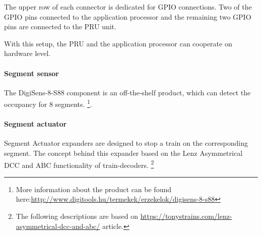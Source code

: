
The upper row of each connector is dedicated for GPIO connections. Two of the GPIO pins connected to the application processor and the remaining two GPIO pins are connected to the PRU unit.

With this setup, the PRU and the application processor can cooperate on hardware level.

\paragraph{Segment sensor}\label{par:SegmentSensor}
The DigiSens-8-S88 component is an off-the-shelf product, which can detect the occupancy for 8 segments. \footnote{More information about the product can be found here:\url{http://www.digitools.hu/termekek/erzekelok/digisens-8-s88}}.

\paragraph{Segment actuator}
Segment Actuator expanders are designed to stop a train on the corresponding segment. The concept behind this expander based on the Lenz Asymmetrical DCC and ABC functionality of train-decoders. \footnote{The following descriptions are based on \url{https://tonystrains.com/lenz-asymmetrical-dcc-and-abc/} article.}

%



